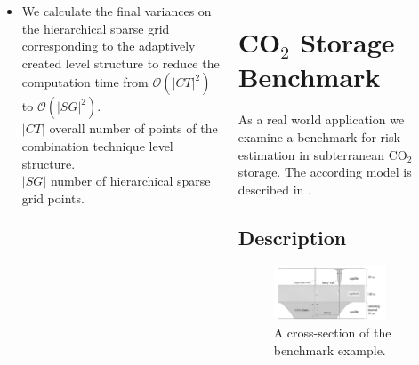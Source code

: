 \documentclass[final,hyperref={pdfpagelabels=false},table]{beamer}
\begin{document}
\begin{frame}
\begin{columns}[T]
\begin{column}{\colCWidth}
\begin{itemize}
\item We  calculate the final variances on the hierarchical sparse grid corresponding to the adaptively created level structure to reduce the computation time from \textbf{$\mathcal{O}( \vert CT \vert^2)$} to \textbf{$\mathcal{O}(\vert SG \vert^2)$}. \\
\small{$\vert CT \vert$ overall number of points of the combination technique level structure.\\
  	$\vert SG \vert$ number of hierarchical sparse grid points.}
\end{itemize}



\end{column}
\begin{column}{\colCWidth}


\justifying
\section{CO$_2$ Storage Benchmark }
As a real world application we examine a benchmark for risk estimation in subterranean CO$_2$ storage. The according model is described in \cite{CO2}.
\subsection{Description}
\begin{figure}
\includegraphics[width=0.8\textwidth]{benchmark.pdf}
\caption{A cross-section of the benchmark example.}
\end{figure}


\end{column}
\end{columns}
\end{frame}
\end{document}
